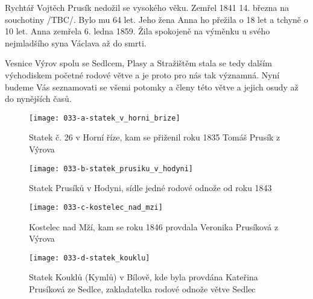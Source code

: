 \documentclass[../dejiny-rodu-prusiku.tex]{subfiles}
\begin{document}
Rychtář Vojtěch Prusík nedožil se vysokého věku. Zemřel 1841 14. března na souchotiny /TBC/. Bylo mu 64 let. Jeho žena Anna ho přežila o 18 let a tchyně o 10 let. Anna zemřela 6. ledna 1859. Žila spokojeně na výměnku u svého nejmladšího syna Václava až do smrti.

Vesnice Výrov spolu se Sedlcem, Plasy a Stražištěm sta­la se tedy dalším východiskem početné rodové větve a je proto pro nás tak významná. Nyní budeme Vás seznamovati se všemi potomky a členy této větve a jejich osudy až do nynějších časů.

\begin{figure}
\centering
\texttt{[image: 033-a-statek\_v\_horni\_brize]}
\caption{Statek č. 26 v Horní říze, kam se přiženil roku 1835 Tomáš Prusík z Výrova}
\label{fig:033-a-statek_v_horni_brize}
\end{figure}

\begin{figure}
\centering
\texttt{[image: 033-b-statek\_prusiku\_v\_hodyni]}
\caption{Statek Prusíků v Hodyni, sídle jedné rodové odnože od roku 1843}
\label{fig:033-b-statek_prusiku_v_hodyni}
\end{figure}

\begin{figure}
\centering
\texttt{[image: 033-c-kostelec\_nad\_mzi]}
\caption{Kostelec nad Mží, kam se roku 1846 provdala Veronika Prusíková z Výrova}
\label{fig:033-c-kostelec_nad_mzi}
\end{figure}

\begin{figure}
\centering
\texttt{[image: 033-d-statek\_kouklu]}
\caption{Statek Kouklů (Kymlů) v Bílově, kde byla provdána Kateřina Prusíková ze Sedlce, zakladatelka rodové odnože větve Sedlec}
\label{fig:033-d-statek_kouklu}
\end{figure}
\end{document}
